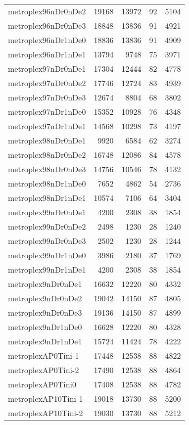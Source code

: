 \begin{longtable}{lrrrr}
metroplex96nDr0nDe2 & 19168 & 13972 & 92 & 5104 \\
metroplex96nDr0nDe3 & 18848 & 13836 & 91 & 4921 \\
metroplex96nDr1nDe0 & 18836 & 13836 & 91 & 4909 \\
metroplex96nDr1nDe1 & 13794 & 9748 & 75 & 3971 \\
metroplex97nDr0nDe1 & 17304 & 12444 & 82 & 4778 \\
metroplex97nDr0nDe2 & 17746 & 12724 & 83 & 4939 \\
metroplex97nDr0nDe3 & 12674 & 8804 & 68 & 3802 \\
metroplex97nDr1nDe0 & 15352 & 10928 & 76 & 4348 \\
metroplex97nDr1nDe1 & 14568 & 10298 & 73 & 4197 \\
metroplex98nDr0nDe1 & 9920 & 6584 & 62 & 3274 \\
metroplex98nDr0nDe2 & 16748 & 12086 & 84 & 4578 \\
metroplex98nDr0nDe3 & 14756 & 10546 & 78 & 4132 \\
metroplex98nDr1nDe0 & 7652 & 4862 & 54 & 2736 \\
metroplex98nDr1nDe1 & 10574 & 7106 & 64 & 3404 \\
metroplex99nDr0nDe1 & 4200 & 2308 & 38 & 1854 \\
metroplex99nDr0nDe2 & 2498 & 1230 & 28 & 1240 \\
metroplex99nDr0nDe3 & 2502 & 1230 & 28 & 1244 \\
metroplex99nDr1nDe0 & 3986 & 2180 & 37 & 1769 \\
metroplex99nDr1nDe1 & 4200 & 2308 & 38 & 1854 \\
metroplex9nDr0nDe1 & 16632 & 12220 & 80 & 4332 \\
metroplex9nDr0nDe2 & 19042 & 14150 & 87 & 4805 \\
metroplex9nDr0nDe3 & 19136 & 14150 & 87 & 4899 \\
metroplex9nDr1nDe0 & 16628 & 12220 & 80 & 4328 \\
metroplex9nDr1nDe1 & 15724 & 11424 & 78 & 4222 \\
metroplexAP0Tini-1 & 17448 & 12538 & 88 & 4822 \\
metroplexAP0Tini-2 & 17490 & 12538 & 88 & 4864 \\
metroplexAP0Tini0 & 17408 & 12538 & 88 & 4782 \\
metroplexAP10Tini-1 & 19018 & 13730 & 88 & 5200 \\
metroplexAP10Tini-2 & 19030 & 13730 & 88 & 5212 \\

\end{longtable}
